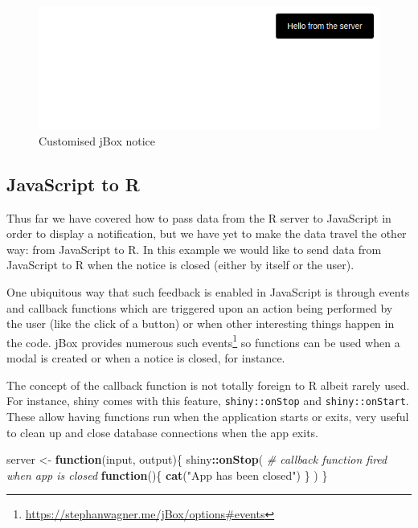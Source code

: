 \documentclass[
]{krantz}
\makeatletter
\newenvironment{Shaded}{\begin{snugshade}}{\end{snugshade}}
\newcommand{\CommentTok}[1]{\textcolor[rgb]{0.37,0.37,0.37}{\textit{#1}}}
\newcommand{\ControlFlowTok}[1]{\textcolor[rgb]{0.27,0.27,0.27}{\textbf{#1}}}
\newcommand{\KeywordTok}[1]{\textcolor[rgb]{0.27,0.27,0.27}{\textbf{#1}}}
\newcommand{\NormalTok}[1]{#1}
\newcommand{\OperatorTok}[1]{\textcolor[rgb]{0.43,0.43,0.43}{\textbf{#1}}}
\newcommand{\StringTok}[1]{\textcolor[rgb]{0.5,0.5,0.5}{#1}}
\renewcommand{\href}[2]{#2\footnote{\url{#1}}}
\newenvironment{kframe}{%
\medskip{}
\setlength{\fboxsep}{.8em}
 \def\at@end@of@kframe{}%
 \ifinner\ifhmode%
  \def\at@end@of@kframe{\end{minipage}}%
  \begin{minipage}{\columnwidth}%
 \fi\fi%
 \def\FrameCommand##1{\hskip\@totalleftmargin \hskip-\fboxsep
 \colorbox{shadecolor}{##1}\hskip-\fboxsep
     \hskip-\linewidth \hskip-\@totalleftmargin \hskip\columnwidth}%
 \MakeFramed {\advance\hsize-\width
   \@totalleftmargin\z@ \linewidth\hsize
   \@setminipage}}%
 {\par\unskip\endMakeFramed%
 \at@end@of@kframe}
\renewenvironment{Shaded}{\begin{kframe}}{\end{kframe}}
\makeatother
\begin{document}
\begin{figure}[t]

{\centering \includegraphics[width=1\linewidth]{images/jbox-custom} 

}

\caption{Customised jBox notice}\label{fig:jbox-custom}
\end{figure}

\hypertarget{shiny-intro-js2r}{%
\subsection{JavaScript to R}\label{shiny-intro-js2r}}

Thus far we have covered how to pass data from the R server to JavaScript in order to display a notification, but we have yet to make the data travel the other way: from JavaScript to R. In this example we would like to send data from JavaScript to R when the notice is closed (either by itself or the user).

One ubiquitous way that such feedback is enabled in JavaScript is through events and callback functions which are triggered upon an action being performed by the user (like the click of a button) or when other interesting things happen in the code. jBox provides numerous such \href{https://stephanwagner.me/jBox/options\#events}{events} so functions can be used when a modal is created or when a notice is closed, for instance.

The concept of the callback function is not totally foreign to R albeit rarely used. For instance, shiny comes with this feature, \texttt{shiny::onStop} and \texttt{shiny::onStart}. These allow having functions run when the application starts or exits, very useful to clean up and close database connections when the app exits.

\begin{Shaded}
\begin{Highlighting}[]
\NormalTok{server <{-}}\StringTok{ }\ControlFlowTok{function}\NormalTok{(input, output)\{}
\NormalTok{  shiny}\OperatorTok{::}\KeywordTok{onStop}\NormalTok{(}
    \CommentTok{\# callback function fired when app is closed}
    \ControlFlowTok{function}\NormalTok{()\{}
      \KeywordTok{cat}\NormalTok{(}\StringTok{"App has been closed"}\NormalTok{)}
\NormalTok{    \}}
\NormalTok{  )}
\NormalTok{\}}
\end{Highlighting}
\end{Shaded}
\end{document}

